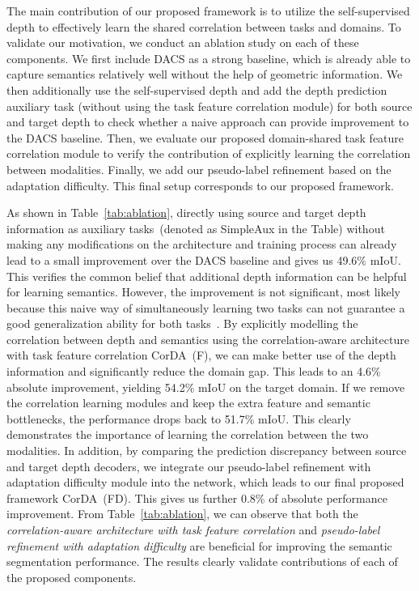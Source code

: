 \documentclass[10pt,twocolumn,letterpaper]{article}
\begin{document}
The main contribution of our proposed framework is to utilize the self-supervised depth to effectively learn the shared correlation between tasks and domains. To validate our motivation, we conduct an ablation study on each of these components. We first include DACS as a strong baseline, which is already able to capture semantics relatively well without the help of geometric information. We then additionally use the self-supervised depth and add the depth prediction auxiliary task (without using the task feature correlation module) for both source and target depth to check whether a naive approach can provide improvement to the DACS baseline. Then, we evaluate our proposed domain-shared task feature correlation module to verify the contribution of explicitly learning the correlation between modalities. Finally, we add our pseudo-label refinement based on the adaptation difficulty. This final setup corresponds to our proposed framework. 

As shown in Table~\ref{tab:ablation}, directly using source and target depth information as auxiliary tasks~(denoted as SimpleAux in the Table) without making any modifications on the architecture and training process can already lead to a small improvement over the DACS baseline and gives us 49.6\% mIoU. This verifies the common belief that additional depth information can be helpful for learning semantics. However, the improvement is not significant, most likely because this naive way of simultaneously learning two tasks can not guarantee a good generalization ability for both tasks~\cite{kokkinos2017ubernet,xu2018pad}. By explicitly modelling the correlation between depth and semantics using the correlation-aware architecture with task feature correlation CorDA~(F), we can make better use of the depth information and significantly reduce the domain gap. This leads to an 4.6\% absolute improvement, yielding 54.2\% mIoU on the target domain. If we remove the correlation learning modules and keep the extra feature and semantic bottlenecks, the performance drops back to 51.7\% mIoU. This clearly demonstrates the importance of learning the correlation between the two modalities. In addition, by comparing the prediction discrepancy between source and target depth decoders, we integrate our pseudo-label refinement with adaptation difficulty module into the network, which leads to our final proposed framework CorDA~(FD). This gives us further 0.8\% of absolute performance improvement. From Table~\ref{tab:ablation}, we can observe that both the \textit{correlation-aware architecture with task feature correlation} and \textit{ pseudo-label refinement with adaptation difficulty} are beneficial for improving the semantic segmentation performance. The results clearly validate contributions of each of the proposed components.
\end{document}
